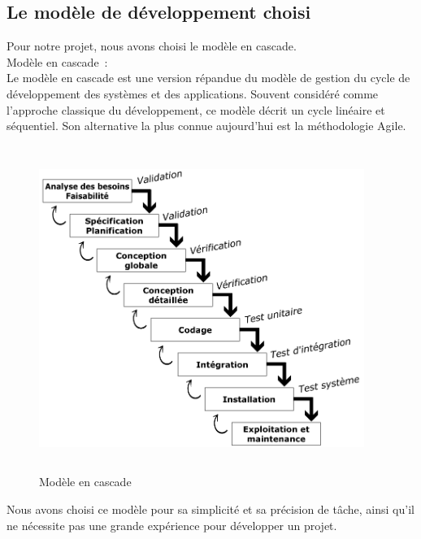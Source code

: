 \documentclass[11.5pt]{report}
\begin{document}
\subsection{Le modèle de développement choisi }
Pour notre projet, nous avons choisi le modèle en cascade.\\
Modèle en cascade :\\
Le modèle en cascade est une version répandue du modèle de gestion du cycle de développement des systèmes et des applications. Souvent considéré comme l'approche classique du développement, ce modèle décrit un cycle linéaire et séquentiel. Son alternative la plus connue aujourd’hui est la méthodologie Agile.
\begin{figure}[h]
	
	\begin{center}
		\includegraphics[width=300pt,height=300pt]{cascade.png} 
		\caption{Modèle en cascade}
	\end{center}
	
\end{figure}
\clearpage
Nous avons choisi ce modèle pour sa simplicité et sa précision de tâche, ainsi qu’il ne nécessite pas une grande expérience pour développer un projet.
\end{document}
